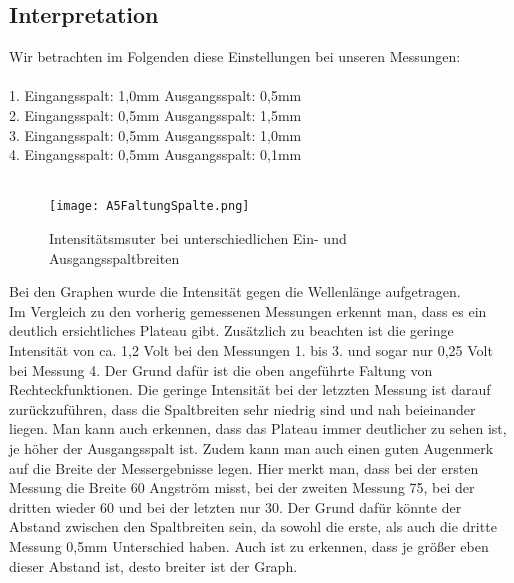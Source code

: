 \subsection* {Interpretation} 
Wir betrachten im Folgenden diese Einstellungen bei unseren Messungen:\\\\
1. Eingangsspalt: 1,0mm \tab Ausgangsspalt: 0,5mm\\
2. Eingangsspalt: 0,5mm \tab Ausgangsspalt: 1,5mm\\
3. Eingangsspalt: 0,5mm \tab Ausgangsspalt: 1,0mm\\
4. Eingangsspalt: 0,5mm \tab Ausgangsspalt: 0,1mm\\
 \\
\begin{figure}[h]
    \centering
    \texttt{[image: A5FaltungSpalte.png]}
    \caption{Intensitätsmsuter bei unterschiedlichen Ein- und Ausgangsspaltbreiten}
\end{figure}
Bei den Graphen wurde die Intensit\"at gegen die Wellenl\"ange aufgetragen. \\
Im Vergleich zu den vorherig gemessenen Messungen erkennt man, dass es ein deutlich ersichtliches Plateau gibt.
Zus\"atzlich zu beachten ist die geringe Intensit\"at von ca. 1,2 Volt bei den Messungen 1. bis 3. und sogar nur 0,25 Volt bei Messung 4. Der Grund daf\"ur ist die oben angef\"uhrte Faltung von 
Rechteckfunktionen. Die geringe Intensit\"at bei der letzzten Messung ist darauf zur\"uckzuf\"uhren, dass die Spaltbreiten sehr niedrig sind und nah beieinander liegen. Man kann auch erkennen, dass das 
Plateau immer deutlicher zu sehen ist, je h\"oher der Ausgangsspalt ist. Zudem kann man auch einen guten Augenmerk auf die Breite der Messergebnisse legen. Hier merkt man, dass bei der ersten Messung die 
Breite 60 Angstr\"om misst, bei der zweiten Messung 75, bei der dritten wieder 60 und bei der letzten nur 30. Der Grund daf\"ur k\"onnte der Abstand zwischen den Spaltbreiten sein, da sowohl die erste, 
als auch die dritte Messung 0,5mm Unterschied haben. Auch ist zu erkennen, dass je gr\"o\ss{}er eben dieser Abstand ist, desto breiter ist der Graph. \\








